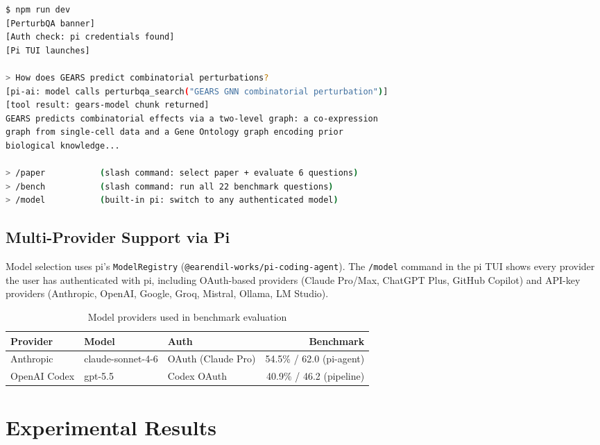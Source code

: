 \documentclass[12pt, a4paper]{article}
\begin{document}
\begin{lstlisting}[language=bash, caption={Pi TUI session with domain tools}]
$ npm run dev
[PerturbQA banner]
[Auth check: pi credentials found]
[Pi TUI launches]

> How does GEARS predict combinatorial perturbations?
[pi-ai: model calls perturbqa_search("GEARS GNN combinatorial perturbation")]
[tool result: gears-model chunk returned]
GEARS predicts combinatorial effects via a two-level graph: a co-expression
graph from single-cell data and a Gene Ontology graph encoding prior
biological knowledge...

> /paper           (slash command: select paper + evaluate 6 questions)
> /bench           (slash command: run all 22 benchmark questions)
> /model           (built-in pi: switch to any authenticated model)
\end{lstlisting}

\subsection{Multi-Provider Support via Pi}

Model selection uses pi's \texttt{ModelRegistry} (\texttt{@earendil-works/pi-coding-agent}).
The \texttt{/model} command in the pi TUI shows every provider the user has authenticated
with pi, including OAuth-based providers (Claude Pro/Max, ChatGPT Plus, GitHub Copilot)
and API-key providers (Anthropic, OpenAI, Google, Groq, Mistral, Ollama, LM Studio).

\begin{table}[ht]
\centering
\caption{Model providers used in benchmark evaluation}
\begin{tabularx}{\textwidth}{llXr}
\toprule
\textbf{Provider} & \textbf{Model} & \textbf{Auth} & \textbf{Benchmark} \\
\midrule
Anthropic    & claude-sonnet-4-6 & OAuth (Claude Pro) & 54.5\% / 62.0 (pi-agent) \\
OpenAI Codex & gpt-5.5          & Codex OAuth        & 40.9\% / 46.2 (pipeline) \\
\bottomrule
\end{tabularx}
\end{table}

\section{Experimental Results}
\end{document}
